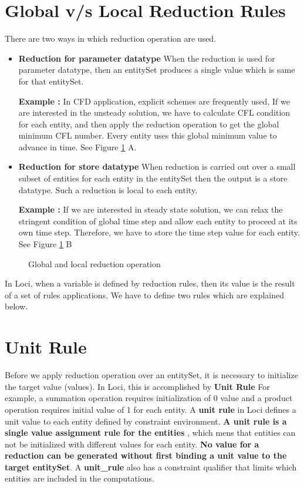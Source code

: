 \section {Global v/s Local Reduction Rules}
There are two ways in which reduction operation are used.
\begin{itemize}
\item  {\bf Reduction for parameter datatype} When the reduction is used for
parameter datatype, then an entitySet produces a single value which is same
for that entitySet.
%
\par {\bf Example :} In CFD application, explicit schemes are frequently used,
If we are interested in the unsteady solution, we have to calculate CFL condition
for each entity, and then apply the reduction operation to get the global
minimum CFL number. Every entity uses this global minimum value to advance in
time. See Figure \ref{FigLocalReduction} A.
%
\item  {\bf Reduction for store datatype} When reduction is carried out over
a small subset of entities for each entity in the entitySet then the output
is a store datatype. Such a reduction is local to each entity.
\par {\bf Example :} If we are interested in steady state solution, we can
relax the stringent condition of global time step and allow each entity to 
proceed at its own time step. Therefore, we have to store the time step value 
for each entity. See Figure \ref{FigLocalReduction} B
\end{itemize}
\begin{figure}[h] 
\vspace{2.50in}\caption { Global and local reduction operation}
\label {FigLocalReduction}
\end{figure}
\par In Loci, when a variable is defined by reduction rules, then its value
is the result of a set of rules applications. We have to define two rules
which are explained below.

\section { Unit Rule }
\par Before we apply reduction operation over an entitySet, it is necessary
to initialize the target value (values). In Loci, this is accomplished by
{\bf Unit Rule } For example, a summation operation requires initialization
of 0 value and a product operation requires initial value of 1 for each entity.
A {\bf unit rule} in Loci defines a unit value to each entity defined by
constraint environment. {\bf A unit rule is a single value assignment rule 
for the entities }, which mens that entities can not be initialized with
different values for each entity.
{\bf No value for a reduction can be generated without first binding a unit 
value to the target entitySet}. 
A {\bf unit\_rule} also has a constraint qualifier that limits
which entities are included in the computations.  

